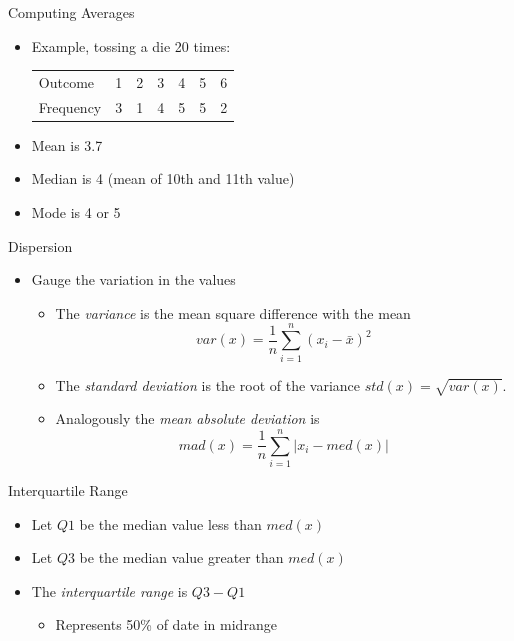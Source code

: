 \documentclass{beamer}
\begin{document}
\begin{frame}{Computing Averages} 
 \begin{itemize} 
  \item Example, tossing a die 20 times: 
\begin{table}
  \begin{tabular}{l | l l l l l l }
\hline 
  Outcome & 1 & 2 & 3 & 4 & 5 & 6 \\ 
  Frequency & 3 & 1 & 4 & 5 & 5 & 2 \\
\hline 
  \end{tabular} 
\end{table}
  \item Mean is 3.7 
  \item Median is 4 (mean of 10th and 11th value)
  \item Mode is 4 or 5 
 \end{itemize}
\end{frame}

\begin{frame}{Dispersion}  
\begin{itemize} 
 \item Gauge the variation in the values 
\begin{itemize} 
\item The \emph{variance} is the mean square difference with the mean 
\begin{displaymath} 
 var(x) = \frac{1}{n}\sum_{i=1}^n (x_i - \bar{x})^2
\end{displaymath}
 \item The \emph{standard deviation} is the root of the variance $std(x) = \sqrt{var(x)}$. 
\item Analogously the \emph{mean absolute deviation} is 
\begin{displaymath} 
  mad(x) = \frac{1}{n}\sum_{i=1}^n |x_i - med(x)|
\end{displaymath}
\end{itemize}
\end{itemize}
\end{frame}

\begin{frame}{Interquartile Range} 
 \begin{itemize} 
  \item Let $Q1$ be the median value less than $med(x)$ 
  \item Let $Q3$ be the median value greater than $med(x)$
  \item The \emph{interquartile range} is $Q3 - Q1$ 
  \begin{itemize}
  \item Represents 50\% of date in midrange  
  \end{itemize} 
 \end{itemize}
\end{frame}
\end{document}
